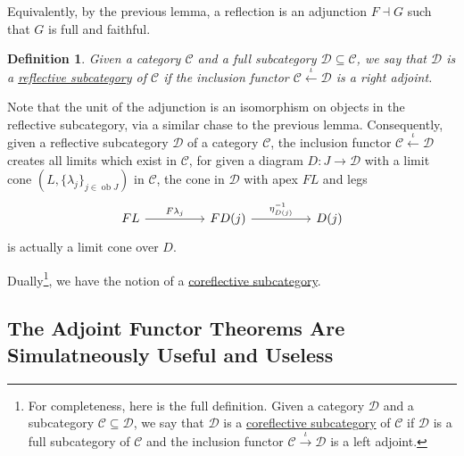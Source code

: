 \documentclass[a4paper,11pt]{article}
\theoremstyle{break_italics}
\newtheorem*{definition*}{Definition}
\theoremstyle{break_upright}
\theoremstyle{remark}
\newcommand{\ob}{\operatorname{ob}}
\newcommand{\C}{\mathcal{C}}
\newcommand{\D}{\mathcal{D}}
\begin{document}
Equivalently, by the previous lemma, a reflection is an adjunction $F \dashv G$ such that $G$ is full and faithful.

\begin{definition*}
	Given a category $\C$ and a full subcategory $\D \subseteq \C$, we say that $\D$ is a \uline{reflective subcategory} of $\C$ if the inclusion functor $\C \xleftarrow{\iota} \D$ is a right adjoint.
\end{definition*}

Note that the unit of the adjunction is an isomorphism on objects in the reflective subcategory, via a similar chase to the previous lemma. Consequently, given a reflective subcategory $\D$ of a category $\C$, the inclusion functor $\C \xleftarrow{\iota} \D$ creates all limits which exist in $\C$, for given a diagram $D \colon J \to \D$ with a limit cone $(L, \{\lambda_j\}_{j\in\ob J})$ in $\C$, the cone in $\D$ with apex $FL$ and legs
\[
\begin{tikzcd}
FL \arrow[rr, "F\lambda_j"] &  & FD(j) \arrow[rr, "\eta_{D(j)}^{-1}"] &  & D(j)
\end{tikzcd}
\]
is actually a limit cone over $D$.

Dually\footnote{For completeness, here is the full definition. Given a category $\D$ and a subcategory $\C \subseteq \D$, we say that $\D$ is a \uline{coreflective subcategory} of $\C$ if $\D$ is a full subcategory of $\C$ and the inclusion functor $\C \xrightarrow{\iota} \D$ is a left adjoint.}, we have the notion of a \uline{coreflective subcategory}.











\subsection{The Adjoint Functor Theorems Are Simulatneously Useful and Useless}
\end{document}
